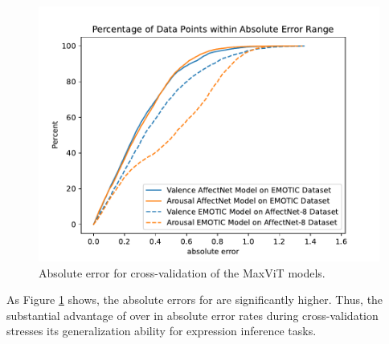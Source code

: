
\begin{figure}[htbp]
    \centering
    \includegraphics[width=0.95\columnwidth]{pictures/inference_cross_validation.pdf}
    \caption{Absolute error for cross-validation of the MaxViT models.}
    \label{fig:benchmarkourapproachcrossvali}
\end{figure}

As Figure \ref{fig:benchmarkourapproachcrossvali} shows, the absolute errors for \va{} are significantly higher. Thus, the substantial advantage of \affectnet{} over \emotic{} in absolute error rates during cross-validation stresses its generalization ability for expression inference tasks.

